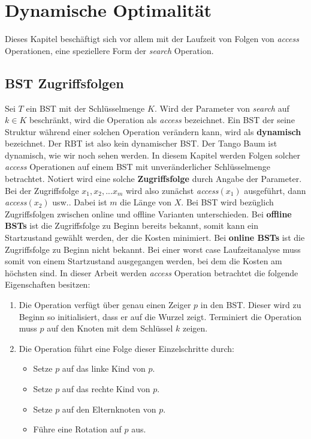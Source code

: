 \documentclass[a4paper,12pt]{article}
\begin{document}
\section{Dynamische Optimalität}
Dieses Kapitel beschäftigt sich vor allem mit der Laufzeit von Folgen von \textit{access} Operationen, eine speziellere Form der \textit{search} Operation.  
\subsection{BST Zugriffsfolgen}
Sei $T$ ein BST mit der Schlüsselmenge $K$. Wird der Parameter von \textit{search} auf $k \in K $ beschränkt, wird  die Operation als \textit{access} bezeichnet. Ein BST der seine Struktur während einer solchen Operation verändern kann, wird als \textbf{dynamisch} bezeichnet. Der RBT ist also kein dynamischer BST. Der Tango Baum ist dynamisch, wie wir noch sehen werden. In diesem Kapitel werden Folgen solcher \textit{access} Operationen auf einem BST mit unveränderlicher Schlüsselmenge betrachtet. Notiert wird eine solche \textbf{Zugriffsfolge} durch Angabe der Parameter. Bei der Zugriffsfolge $x_1,x_2,...x_m$ wird also zunächst \textit{access}$(x_1)$ ausgeführt, dann \textit{access}$(x_2)$ usw.. Dabei ist $m$ die Länge von $X$. Bei BST wird bezüglich Zugriffsfolgen zwischen online und offline Varianten unterschieden. Bei \textbf{offline BSTs} ist die Zugriffsfolge zu Beginn bereits bekannt, somit kann ein Startzustand gewählt werden, der die Kosten minimiert. Bei \textbf{online BSTs} ist die Zugriffsfolge zu Beginn nicht bekannt. Bei einer worst case Laufzeitanalyse muss somit von einem Startzustand ausgegangen werden, bei dem die Kosten am höchsten sind.
In dieser Arbeit werden \textit{access} Operation betrachtet die folgende Eigenschaften besitzen:

\begin{enumerate} 
	\item Die Operation verfügt über genau einen Zeiger $p$ in den BST. Dieser wird zu Beginn so initialisiert, dass er auf die Wurzel zeigt. Terminiert die Operation muss $p$ auf den Knoten mit dem Schlüssel $k$ zeigen.
	\item Die Operation führt eine Folge dieser Einzelschritte durch:
	\begin{itemize}
		\item Setze $p$ auf das linke Kind von $p$.
		\item Setze $p$ auf das rechte Kind von $p$.
		\item Setze $p$ auf den Elternknoten von $p$.
		\item Führe eine Rotation auf $p$ aus.
	\end{itemize}  
	
\end{enumerate}
\end{document}
